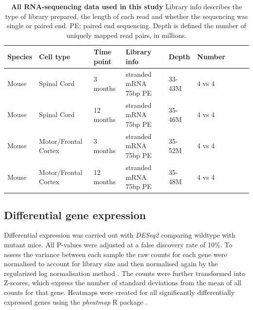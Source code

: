 \begin{table}[h!]
	\caption[All RNA-sequencing data used in this study]{
		\textbf{All RNA-sequencing data used in this study}
	Library info describes the type of library prepared, the length of each read and whether the sequencing was single or paired end. PE: paired end sequencing. Depth is defined the number of uniquely mapped read pairs, in millions.
}
	\label{table:fus_mice_rnaseq}
	\begin{center}
		\begin{small}
			\begin{tabular}{llllp{1.5cm}llll}
				Species & Cell type & Time point & Library info & Depth & Number\\
				\hline
				Mouse & Spinal Cord & 3 months & stranded mRNA 75bp PE & 33-43M & 4 vs 4\\
				Mouse & Spinal Cord & 12 months & stranded mRNA 75bp PE & 35-46M & 4 vs 4\\ 
				Mouse & Motor/Frontal Cortex & 3 months & stranded mRNA 75bp PE & 35-52M & 4 vs 4\\
				Mouse & Motor/Frontal Cortex & 12 months & stranded mRNA 75bp PE & 35-48M & 4 vs 4\\ 
			\end{tabular}
		\end{small}
	\end{center}
\end{table}

\subsection{Differential gene expression}
Differential expression was carried out with \textit{DESeq2} \citep{Love2014} comparing wildtype with mutant mice. All P-values were adjusted at a false discovery rate of 10\%. To assess the variance between each sample the raw counts for each gene were normalised to account for library size and then normalised again by the regularized log normalisation method \citep{Love2014}. The counts were further transformed into Z-scores, which express the number of standard deviations from the mean of all counts for that gene. Heatmaps were created for all significantly differentially expressed genes using the \textit{pheatmap} R package \citep{Kolde2012}.  

